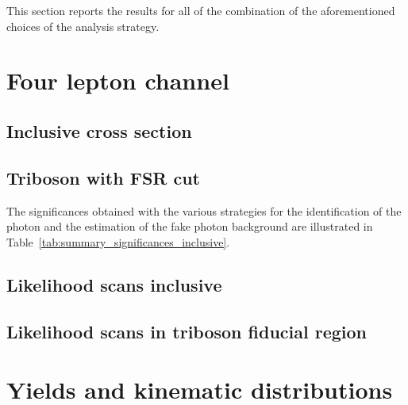 This section reports the results for all of the combination of the aforementioned choices of the analysis strategy.

\section{Four lepton channel}
\subsection{Inclusive cross section}


\subsection{Triboson with FSR cut}

The significances obtained with the various strategies for the identification of the photon and the estimation of the fake photon background are illustrated in Table~\ref{tab:summary_significances_inclusive}.


\subsection{Likelihood scans inclusive}

\subsection{Likelihood scans in triboson fiducial region}


\section{Yields and kinematic distributions}

